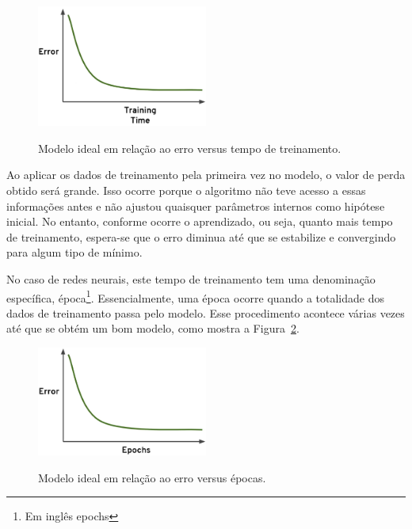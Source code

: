            \begin{figure}[H]
                \centering
                \caption{Modelo ideal em relação ao erro versus tempo de treinamento.}
                \includegraphics[width=0.5\textwidth]{fig/2-fundamentacao/overfitting/multidimencional_treinamento.png}
                \fonte{}
                \label{fig:erro_tempo_treinamento}
            \end{figure}
            
            Ao aplicar os dados de treinamento pela primeira vez no modelo, o valor de perda obtido será grande. Isso ocorre porque o algoritmo não teve acesso a essas informações antes e não ajustou quaisquer parâmetros internos como hipótese inicial. No entanto, conforme ocorre o aprendizado, ou seja, quanto mais tempo de treinamento, espera-se que o erro diminua até que se estabilize e convergindo para algum tipo de mínimo.
            
            No caso de redes neurais, este tempo de treinamento tem uma denominação específica, época\footnote{Em inglês epochs}. Essencialmente, uma época ocorre quando a totalidade dos dados de treinamento passa pelo modelo. Esse procedimento acontece várias vezes até que se obtém um bom modelo, como mostra a Figura~\ref{fig:epoch}. %
            
            \begin{figure}[H]
                \centering
                \caption{Modelo ideal em relação ao erro versus épocas.}
                \includegraphics[width=0.5\textwidth]{fig/2-fundamentacao/overfitting/epoch.png}
                \label{fig:epoch}
            \end{figure}
            
